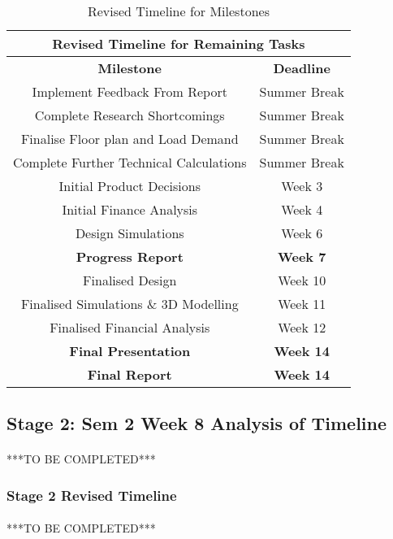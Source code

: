 \begin{table}[H]
\centering
\begin{tabular}{||c c||} 
 \hline
 \multicolumn{2}{|c|}{\textbf{Revised Timeline for Remaining Tasks}} \\ \hline\hline
 \textbf{Milestone} & \textbf{Deadline}\\ [0.5ex] 
 \hline\hline
 Implement Feedback From Report & Summer Break  \\
 Complete Research Shortcomings & Summer Break  \\
 Finalise Floor plan and Load Demand & Summer Break  \\
 Complete Further Technical Calculations & Summer Break  \\
 Initial Product Decisions & Week 3  \\
 Initial Finance Analysis & Week 4  \\
 Design Simulations & Week 6  \\ 
 \textbf{Progress Report} & \textbf{Week 7}  \\
 Finalised Design & Week 10  \\
 Finalised Simulations \& 3D Modelling & Week 11  \\
 Finalised Financial Analysis & Week 12  \\ 
 \textbf{Final Presentation} & \textbf{Week 14} \\
 \textbf{Final Report} & \textbf{Week 14} \\ [1ex] 
 \hline
\end{tabular}
\caption{Revised Timeline for Milestones}
\label{table:milestones_3}
\end{table} 

\subsection{Stage 2: Sem 2 Week 8 Analysis of Timeline}

\paragraph{}
***TO BE COMPLETED***

\subsubsection{Stage 2 Revised Timeline}

\paragraph{}
***TO BE COMPLETED***
